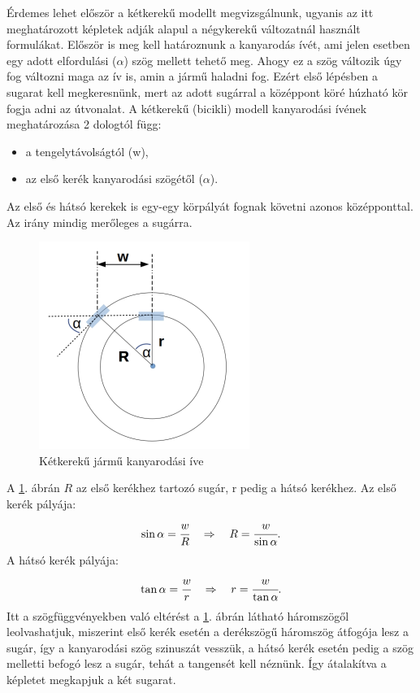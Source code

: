 

Érdemes lehet először a kétkerekű modellt megvizsgálnunk, ugyanis az itt meghatározott képletek adják alapul a négykerekű változatnál használt formulákat. Először is meg kell határoznunk a kanyarodás ívét, ami jelen esetben egy adott elfordulási ($\alpha$) szög mellett tehető meg. Ahogy ez a szög változik úgy fog változni maga az ív is, amin a jármű haladni fog. Ezért első lépésben a sugarat kell megkeresnünk, mert az adott sugárral a középpont köré húzható kör fogja adni az útvonalat. 
A kétkerekű (bicikli) modell kanyarodási ívének meghatározása 2 dologtól függ:
\begin{itemize}
	\item a tengelytávolságtól (w),
	\item az első kerék kanyarodási szögétől ($\alpha$).
\end{itemize}
Az első és hátsó kerekek is egy-egy körpályát fognak követni azonos középponttal. Az irány mindig merőleges a sugárra.

\begin{figure}[h!]
\centering
\includegraphics[scale=0.5]{images/two_wheels_rad.png}
\caption{Kétkerekű jármű kanyarodási íve}
\label{fig:two_wheels_rad}
\end{figure}

A \ref{fig:two_wheels_rad}. ábrán $R$ az első kerékhez tartozó sugár, r pedig a hátsó kerékhez.
Az első kerék pályája:
\[
\sin\alpha = \cfrac{w}{R}
\quad \Rightarrow \quad
R = \cfrac{w}{\sin\alpha}.
\]
A hátsó kerék pályája:
\[
\tan\alpha = \cfrac{w}{r}
\quad \Rightarrow \quad
r = \cfrac{w}{\tan\alpha}.
\]
Itt a szögfüggvényekben való eltérést a \ref{fig:two_wheels_rad}. ábrán látható háromszögől leolvashatjuk, miszerint első kerék esetén a derékszögű háromszög átfogója lesz a sugár, így a kanyarodási szög szinuszát vesszük, a hátsó kerék esetén pedig a szög melletti befogó lesz a sugár, tehát a tangensét kell néznünk. Így átalakítva a képletet megkapjuk a két sugarat.   

